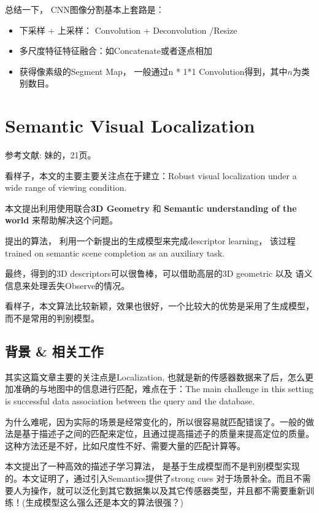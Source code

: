 总结一下， CNN图像分割基本上套路是：
\begin{itemize}
\item 下采样 + 上采样： Convolution + Deconvolution /Resize
\item 多尺度特征特征融合：如Concatenate或者逐点相加
\item 获得像素级的Segment Map， 一般通过n * 1*1 Convolution得到，其中$n$为类别数目。
\end{itemize}

\section{Semantic Visual Localization}

参考文献: \cite{SemanticVisualLocalization2017}
妹的，21页。

看样子，本文的主要主要关注点在于建立：Robust visual localization under a wide range of viewing condition.

本文提出利用使用联合\textbf{3D Geometry }和 \textbf{Semantic understanding of the world} 来帮助解决这个问题。

提出的算法， 利用一个新提出的生成模型来完成descriptor learning， 该过程trained on semantic scene completion as an auxiliary task.

最终，得到的3D descriptors可以很鲁棒，可以借助高层的3D geometric 以及 语义信息来处理丢失Observe的情况。

看样子，本文算法比较新颖，效果也很好，一个比较大的优势是采用了生成模型，而不是常用的判别模型。

\subsection{背景 \& 相关工作}

其实这篇文章主要的关注点是Localization, 也就是新的传感器数据来了后，怎么更加准确的与地图中的信息进行匹配，难点在于：The main challenge in this setting is successful data association between the query and the database.

为什么难呢，因为实际的场景是经常变化的，所以很容易就匹配错误了。一般的做法是基于描述子之间的匹配来定位，且通过提高描述子的质量来提高定位的质量。这种方法还是不好，比如尺度性不好、需要大量的匹配计算等。

本文提出了一种高效的描述子学习算法， 是基于生成模型而不是判别模型实现的。本文证明了，通过引入Semantics提供了strong cues 对于场景补全。而且不需要人为操作，就可以泛化到其它数据集以及其它传感器类型，并且都不需要重新训练！(生成模型这么强么还是本文的算法很强？)

